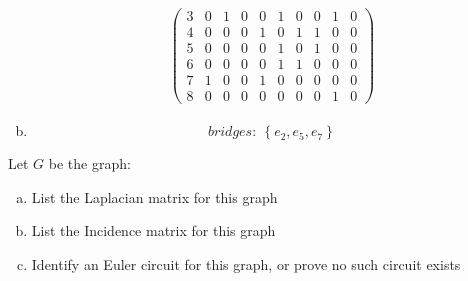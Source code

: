 \documentclass[10pt,letterpaper, cm]{hmcpset}
\begin{document}
\begin{enumerate}[(a)]
\begin{align*}
\begin{pmatrix}
         3   & 0 & 1 & 0 & 0 & 1 & 0 & 0 & 1 & 0  \\

         4   & 0 & 0 & 0 & 1 & 0 & 1 & 1 & 0 & 0 \\

         5   & 0 & 0 & 0 & 0 & 1 & 0 & 1 & 0 & 0 \\

         6   & 0 & 0 & 0 & 0 & 1 & 1 & 0 & 0 & 0 \\

         7   & 1 & 0 & 0 & 1 & 0 & 0 & 0 & 0 & 0 \\

         8   & 0 & 0 & 0 & 0 & 0 & 0 & 0 & 1 & 0

      \end{pmatrix}  
              \end{align*}

  \item
    \begin{equation*}
      bridges:~\left\{e_2,e_5,e_7\right\}
    \end{equation*}
\end{enumerate}

\begin{problem}[8]
    Let $G$ be the graph:
    
    \begin{center}
    \end{center}

    \begin{enumerate}[(a)]
        \item List the Laplacian matrix for this graph
        \item List the Incidence matrix for this graph
        \item Identify an Euler circuit for this graph, or prove no such circuit exists
    \end{enumerate}
\end{problem}
\end{document}
